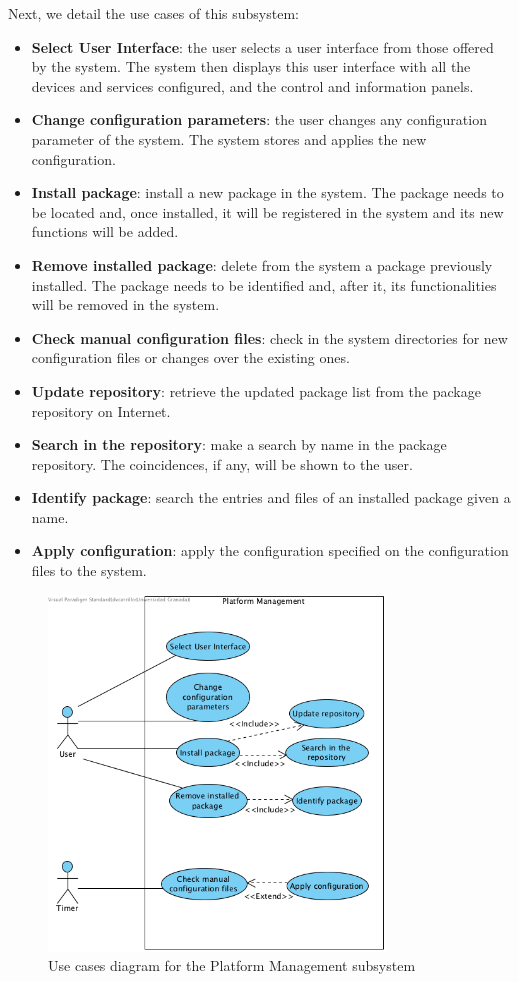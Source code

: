 Next, we detail the use cases of this subsystem:
\begin{itemize}
	\item \textbf{Select User Interface}: the user selects a user interface from those offered by the system. The system then displays
	this user interface with all the devices and services configured, and the control and information panels.
	\item \textbf{Change configuration parameters}: the user changes any configuration parameter of the system. The system stores 
	and applies the new configuration.
	\item \textbf{Install package}: install a new package in the system. The package needs to be located and, once installed, it will be
	registered in the system and its new functions will be added.
	\item \textbf{Remove installed package}: delete from the system a package previously installed. The package needs to be identified
	and, after it, its functionalities will be removed in the system.
	\item \textbf{Check manual configuration files}: check in the system directories for new configuration files or changes over 
	the existing ones.
	\item \textbf{Update repository}: retrieve the updated package list from the package repository on Internet.
	\item \textbf{Search in the repository}: make a search by name in the package repository. The coincidences, if any, will be shown
	to the user.
	\item \textbf{Identify package}: search the entries and files of an installed package given a name.
	\item \textbf{Apply configuration}: apply the configuration specified on the configuration files to the system.
\end{itemize}

\begin{figure}
	\centering
	\includegraphics[width=0.8\textwidth]{images/Chapter_07/UC-platform-management.png}
	\caption{Use cases diagram for the Platform Management subsystem}
	\label{fig:UC-platform-management}
\end{figure}

